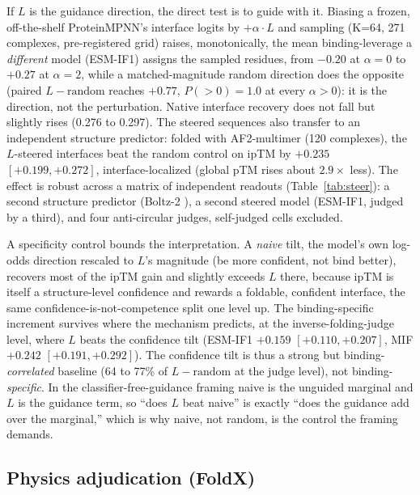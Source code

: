 \documentclass{article} %
\begin{document}
If $L$ is the guidance direction, the direct test is to guide with it. Biasing a frozen, off-the-shelf
ProteinMPNN's interface logits by $+\alpha \cdot L$ and sampling (K=64, 271 complexes, pre-registered grid) raises,
monotonically, the mean binding-leverage a \emph{different} model (ESM-IF1) assigns the sampled residues, from
$-0.20$ at $\alpha=0$ to $+0.27$ at $\alpha=2$, while a matched-magnitude random direction does the opposite (paired
$L - \text{random}$ reaches $+0.77$, $P(>0)=1.0$ at every $\alpha>0$): it is the direction, not the perturbation.
Native interface recovery does not fall but slightly rises (0.276 to 0.297). The steered sequences also transfer to
an independent structure predictor: folded with AF2-multimer (120 complexes), the $L$-steered interfaces beat the
random control on ipTM by $+0.235$ $[+0.199, +0.272]$, interface-localized (global pTM rises about $2.9\times$
less). The effect is robust across a matrix of independent readouts (Table~\ref{tab:steer}): a second structure
predictor (Boltz-2 \citep{passaro2025boltz2}), a second steered model (ESM-IF1, judged by a third), and four
anti-circular judges, self-judged cells excluded.

A specificity control bounds the interpretation. A \emph{naive} tilt, the model's own log-odds direction rescaled
to $L$'s magnitude (be more confident, not bind better), recovers most of the ipTM gain and slightly exceeds $L$
there, because ipTM is itself a structure-level confidence and rewards a foldable, confident interface, the same
confidence-is-not-competence split one level up. The binding-specific increment survives where the mechanism
predicts, at the inverse-folding-judge level, where $L$ beats the confidence tilt (ESM-IF1 $+0.159$ $[+0.110,
+0.207]$, MIF $+0.242$ $[+0.191, +0.292]$). The confidence tilt is thus a strong but binding-\emph{correlated}
baseline (64 to 77\% of $L - \text{random}$ at the judge level), not binding-\emph{specific}. In the
classifier-free-guidance framing naive is the unguided marginal and $L$ is the guidance term, so ``does $L$ beat
naive'' is exactly ``does the guidance add over the marginal,'' which is why naive, not random, is the control the
framing demands.



\subsection{Physics adjudication (FoldX)}
\end{document}
